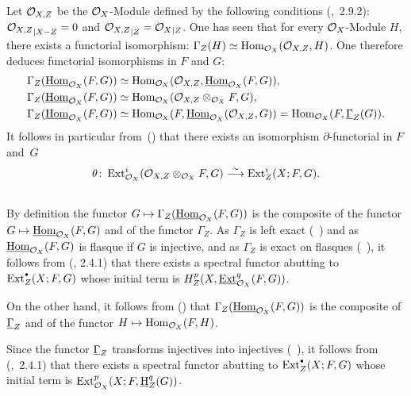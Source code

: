 \subsection{} \label{VI.1.4}
Let ${\mathcal O}_{X, Z}$ be the $\mathcal{O}_X$-Module defined by the following conditions (\cite{Godement},~2.9.2): ${{\mathcal O}_{X, Z}}_{|X{-} Z}=0$ and ${{\mathcal O}_{X, Z}}_{|Z}={\mathcal{O}_X}_{|Z}$. One has seen that for every $\mathcal{O}_X$-Module $H$, there exists a functorial isomorphism: $\Gamma_Z(H)\simeq \operatorname{Hom}_{\mathcal{O}_X}({\mathcal O}_{X, Z}, H)$. One therefore deduces functorial isomorphisms in $F$ and $G$: \setcounter{equation}{0}
\begin{align}
\label{VI.1.4.1}
\Gamma_Z(\operatorname{\underline{Hom}}_{\mathcal{O}_X}(F, G)) &\simeq \operatorname{Hom}_{\mathcal{O}_X}({\mathcal O}_{X, Z}, \operatorname{\underline{Hom}}_{\mathcal{O}_X}(F, G)),\\
\label{VI.1.4.2} \Gamma_Z(\operatorname{\underline{Hom}}_{\mathcal{O}_X}(F, G)) &\simeq \operatorname{Hom}_{\mathcal{O}_X}({\mathcal O}_{X, Z}\otimes_{\mathcal{O}_X} F, G),\\
\label{VI.1.4.3} \Gamma_Z(\operatorname{\underline{Hom}}_{\mathcal{O}_X}(F, G)) &\simeq \operatorname{Hom}_{\mathcal{O}_X}(F, \operatorname{\underline{Hom}}_{\mathcal{O}_X}({\mathcal O}_{X, Z}, G))=\operatorname{Hom}_{\mathcal{O}_X}(F, \underline{\Gamma}_Z(G)).
\end{align}
It follows in particular from~() that there exists an isomorphism $\partial$-functorial in $F$ and~$G$
\[
\theta\colon \operatorname{Ext}_{{\mathcal{O}_X}}^i({\mathcal O}_{X, Z}\otimes_{\mathcal{O}_X} F, G)\overset{\sim}{\longrightarrow}\operatorname{Ext}_{Z}^i(X;F, G).
\]

\subsection{} \label{VI.1.5}
By definition the functor $G \mto \Gamma_Z(\SheafHom_{\OX}(F, G))$ is the composite of the functor $G \mto\SheafHom_{\OX}(F, G)$ and of the functor $\Gamma_Z$. As $\Gamma_Z$ is left exact (~) and as $\operatorname{\underline{Hom}}_{\mathcal{O}_X}(F, G)$ is flasque if $G$ is injective, and as $\Gamma_Z$ is exact on flasques (~), it follows from (\cite{Tohoku}, 2.4.1) that there exists a spectral functor abutting to $\Ext_{Z}^\boule(X;F, G)$ whose initial term is $H_Z^p(X, \operatorname{\underline{Ext}}_{\mathcal{O}_X}^q(F, G))$.

On the other hand, it follows from () that $\Gamma_Z(\operatorname{\underline{Hom}}_{\mathcal{O}_X}(F, G))$ is the composite of $\underline{\Gamma}_Z$ and of the functor $H \mto \Hom_{\OX}(F, H)$.

Since the functor $\underline{\Gamma}_Z$ transforms injectives into injectives (~), it follows from (\cite{Tohoku},~2.4.1) that there exists a spectral functor abutting to $\Ext_{Z}^\boule(X;F, G)$ whose initial term is $\operatorname{Ext}_{\mathcal{O}_X}^p(X;F, \operatorname{\underline{H}}_Z^q(G))$.

